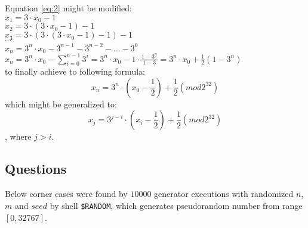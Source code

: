 \documentclass[a4paper,10pt]{article}
\begin{document}
Equation \ref{eq:2} might be modified: \\
 $x_1 = 3 \cdot x_0 -1$ \\
 $x_2 = 3 \cdot (3 \cdot x_0 - 1) -1$ \\
 $x_3 = 3 \cdot (3 \cdot (3 \cdot x_0 -1) - 1) -1$ \\
 $\cdots$ \\
 $x_n = 3^n \cdot x_0 - 3^{n-1} - 3^{n-2} - \ldots - 3^0$ \\
 $x_n = 3^n \cdot x_0 - \sum_{i=0}^{n-1} 3^i = 3^n \cdot x_0 - 1 \cdot \frac{1-3^n}{1-3} = 3^n \cdot x_0 + \frac{1}{2}(1-3^n)$ \\
 to finally achieve to following formula:
\begin{equation}
 \label{eq:22}
 x_n = 3^n \cdot (x_0 - \frac{1}{2}) + \frac{1}{2} (mod 2^{32})
 \end{equation}
which might be generalized to:
\begin{equation}
 \label{eq:23}
 x_j = 3^{j-i} \cdot (x_i - \frac{1}{2}) + \frac{1}{2} (mod 2^{32})
 \end{equation}
 , where $j>i$.

 
\subsection{Questions}
Below corner cases were found by $10000$ generator executions with randomized $n$, $m$ and $seed$ by shell \texttt{\$RANDOM}, which generates pseudorandom number from range $[0,32767]$.
\\
\end{document}
